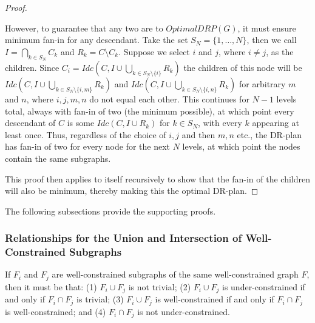 \begin{proof}
\begin{enumerate}
However, to guarantee that any two are  to $OptimalDRP(G)$, it must ensure minimum fan-in for any descendant. Take the set $S_N=\{1,\dots,N\}$, then we call $I=\bigcap_{k\in S_N}{C_k}$ and $R_k=C\setminus C_k$. Suppose we select $i$ and $j$, where $i\neq j$, as the children. Since
$C_i=Idc\left(C,I\cup\bigcup_{k\in S_N\setminus\{i\}}{R_k}\right)$
the children of this node will be
$Idc\left(C,I\cup\bigcup_{k\in S_N\setminus\{i,m\}}{R_k}\right)$
and
$Idc\left(C,I\cup\bigcup_{k\in S_N\setminus\{i,n\}}{R_k}\right)$
for arbitrary $m$ and $n$, where $i,j,m,n$ do not equal each other.  This continues for $N-1$ levels total, always with fan-in of two (the minimum possible), at which point every descendant of $C$ is some $Idc(C,I\cup R_k)$ for $k\in S_N$, with every $k$ appearing at least once. Thus, regardless of the choice of $i,j$ and then $m,n$ etc., the DR-plan has fan-in of two for every node for the next $N$ levels, at which point the nodes contain the same subgraphs.
\end{enumerate}
%
This proof then applies to itself recursively to show that the fan-in of the children will also be minimum, thereby making this the optimal DR-plan.
\end{proof}

The following subsections provide the supporting proofs.




\subsubsection{Relationships for the Union and Intersection of Well-Constrained Subgraphs}
\label{sec:union_intersection}

\begin{remark}\label{lemma:union_intersection}
If $F_i$ and $F_j$ are well-constrained subgraphs of the same well-constrained graph $F$, then it must be that: (1) $F_i\cup F_j$ is not trivial; (2) $F_i\cup F_j$ is under-constrained if and only if $F_i\cap F_j$ is trivial; (3) $F_i\cup F_j$ is well-constrained if and only if $F_i\cap F_j$ is well-constrained; and (4) $F_i\cap F_j$ is not under-constrained.
\end{remark}


